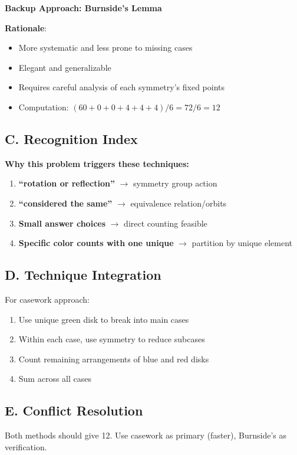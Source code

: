 \documentclass[11pt]{article}
\begin{document}
\begin{techniquesbox}
\textbf{Backup Approach: Burnside's Lemma}

\textbf{Rationale}: 
\begin{itemize}
    \item More systematic and less prone to missing cases
    \item Elegant and generalizable
    \item Requires careful analysis of each symmetry's fixed points
    \item Computation: $(60 + 0 + 0 + 4 + 4 + 4)/6 = 72/6 = 12$
\end{itemize}

\subsection*{C. Recognition Index}

\textbf{Why this problem triggers these techniques:}
\begin{enumerate}
    \item \textbf{``rotation or reflection''} $\rightarrow$ symmetry group action
    \item \textbf{``considered the same''} $\rightarrow$ equivalence relation/orbits
    \item \textbf{Small answer choices} $\rightarrow$ direct counting feasible
    \item \textbf{Specific color counts with one unique} $\rightarrow$ partition by unique element
\end{enumerate}

\subsection*{D. Technique Integration}

For casework approach:
\begin{enumerate}
    \item Use unique green disk to break into main cases
    \item Within each case, use symmetry to reduce subcases
    \item Count remaining arrangements of blue and red disks
    \item Sum across all cases
\end{enumerate}

\subsection*{E. Conflict Resolution}

Both methods should give 12. Use casework as primary (faster), Burnside's as verification.
\end{techniquesbox}
\end{document}
